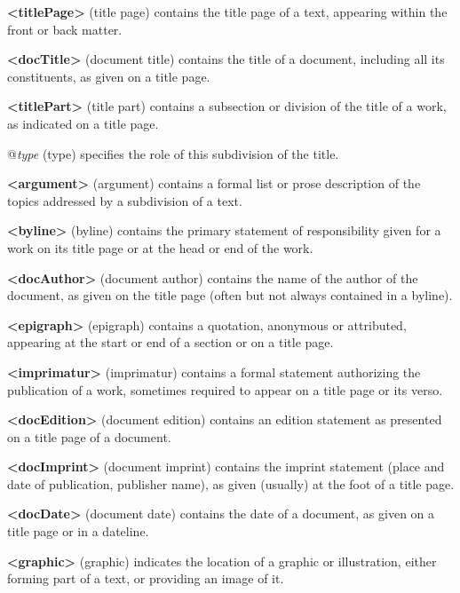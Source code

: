 \begin{sansreflist}
  
\item [\textbf{<titlePage>}] (title page) contains the title page of a text, appearing within the front or back matter.
\item [\textbf{<docTitle>}] (document title) contains the title of a document, including all its constituents, as given on a title page.
\item [\textbf{<titlePart>}] (title part) contains a subsection or division of the title of a work, as indicated on a title page.\hfil\\[-10pt]\begin{sansreflist}
    \item[@{\itshape type}]
  (type) specifies the role of this subdivision of the title.
\end{sansreflist}  
\item [\textbf{<argument>}] (argument) contains a formal list or prose description of the topics addressed by a subdivision of a text.
\item [\textbf{<byline>}] (byline) contains the primary statement of responsibility given for a work on its title page or at the head or end of the work.
\item [\textbf{<docAuthor>}] (document author) contains the name of the author of the document, as given on the title page (often but not always contained in a byline).
\item [\textbf{<epigraph>}] (epigraph) contains a quotation, anonymous or attributed, appearing at the start or end of a section or on a title page.
\item [\textbf{<imprimatur>}] (imprimatur) contains a formal statement authorizing the publication of a work, sometimes required to appear on a title page or its verso.
\item [\textbf{<docEdition>}] (document edition) contains an edition statement as presented on a title page of a document.
\item [\textbf{<docImprint>}] (document imprint) contains the imprint statement (place and date of publication, publisher name), as given (usually) at the foot of a title page.
\item [\textbf{<docDate>}] (document date) contains the date of a document, as given on a title page or in a dateline.
\item [\textbf{<graphic>}] (graphic) indicates the location of a graphic or illustration, either forming part of a text, or providing an image of it.
\end{sansreflist}
